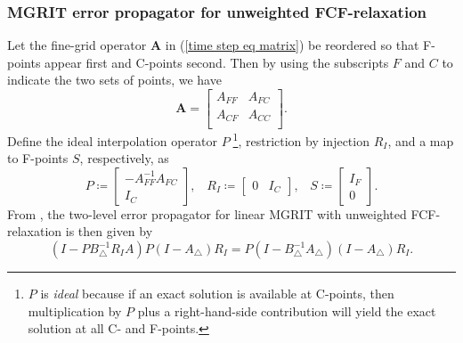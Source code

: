 \documentclass[VANCOUVER,STIX1COL]{WileyNJD-v2}
\makeatletter
\newcommand{\bs}[1]{\textcolor{magenta}{[BS\@: #1]}}
\newcommand{\SF}[1]{\textcolor{orange}{[SF\@: #1]}}
\newcommand{\JS}[1]{\textcolor{blue}{[JS\@: #1]}}
\makeatother
\begin{document}
\subsubsection{MGRIT error propagator for unweighted FCF-relaxation}

Let the fine-grid operator $\mathbf{A}$ in (\ref{time step eq matrix}) be reordered so that F-points appear first and C-points second.  Then by using the subscripts $F$ and $C$ 
to indicate the two sets of points, we have
$$\mathbf{A}=
\begin{bmatrix}
A_{FF} & A_{FC} \\
A_{CF} & A_{CC}\\
\end{bmatrix}.$$
Define the ideal interpolation operator $P\;$\footnote{$P$ is \textit{ideal} because if an exact solution is available at C-points, then
multiplication by $P$ plus a right-hand-side contribution will yield the exact solution at all C- and F-points.},
restriction by injection $R_I$, and a map to F-points $S$, respectively, as
$$ P \coloneqq \begin{bmatrix} -A_{FF}^{-1}A_{FC} \\
I_C \end{bmatrix}, \hspace{10pt}
R_I \coloneqq \begin{bmatrix} 0 & I_C \end{bmatrix}, \hspace{10pt}
S \coloneqq \begin{bmatrix}
I_F\\ 0 \end{bmatrix}.
$$
{From \cite{Fa2014}, the two-level error propagator for linear MGRIT with unweighted FCF-relaxation is then given by}
\begin{equation} \label{two level error FCF}
(I - P B_{\triangle}^{-1} R_I A)P(I - A_{\triangle})R_I = P(I - B_{\triangle}^{-1} A_{\triangle}) (I - A_{\triangle})R_I.
\end{equation}
\end{document}
